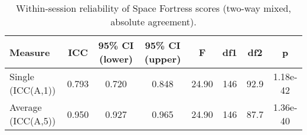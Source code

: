 \begin{table}[ht]
\centering
\caption{Within-session reliability of Space Fortress scores (two-way mixed, absolute agreement).}
\label{tab:icc_sf}
\begin{tabular}{lccccccc}
\toprule
Measure & ICC & 95\% CI (lower) & 95\% CI (upper) & F & df1 & df2 & p \\
\midrule
Single (ICC(A,1)) & 0.793 & 0.720 & 0.848 & 24.90 & 146 & 92.9 & 1.18e-42 \\
Average (ICC(A,5)) & 0.950 & 0.927 & 0.965 & 24.90 & 146 & 87.7 & 1.36e-40 \\
\bottomrule
\end{tabular}
\end{table}
